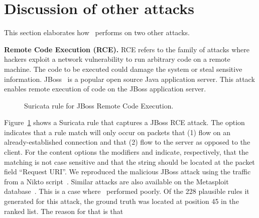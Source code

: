 \documentclass[sigconf,review, anonymous]{acmart}
\begin{document}
\section{Discussion of other attacks}
\label{sec:rce}
\label{sec:jboss}
\label{sec:content-example}
\label{sec:dos}

This section elaborates how \tname\ performs on two other attacks.

\textbf{Remote Code Execution (RCE).}  RCE refers to the family of
attacks where hackers exploit a network vulnerability to run arbitrary
code on a remote machine. The code to be executed could damage the
system or steal sensitive information. JBoss~\cite{jboss} is a popular
open source Java application server. This attack enables remote
execution of code on the JBoss application server.




\begin{figure}[H]
  
  \vspace{-2ex}  
  \caption{\label{fig:rule-jboss}Suricata rule for JBoss Remote Code
    Execution.}
  \vspace{-3ex}
\end{figure}


Figure~\ref{fig:rule-jboss} shows a Suricata rule that captures a
JBoss RCE attack.  The option 
indicates that a rule match will only occur on packets that (1) flow
on an already-established connection and that (2) flow to the server
as opposed to the client. For the content options the modifiers
 and  indicate, respectively, that
the matching is not case sensitive and that the string should be
located at the packet field ``Request URI''. We reproduced the
malicious JBoss attack using the traffic from a Nikto
script~\cite{nikto}. Similar attacks are also available on the
Metasploit database~\cite{metasploit}. This is a case where
\tname\ performed poorly. Of the 228 plausible rules it generated for
this attack, the ground truth was located at position 45 in the ranked
list. The reason for that is that 
\end{document}
